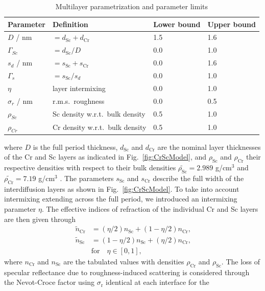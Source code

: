 \begin{table}
\centering
\caption{Multilayer parametrization and parameter limits}
\label{tbl:parametrization}
\begin{tabular}{@{}llll@{}}
\toprule
Parameter & Definition & Lower bound & Upper bound\\ \midrule
$D$ / nm & $= d_\text{Sc} + d_\text{Cr}$ & 1.5&1.6 \\ 
$\Gamma_{Sc}$ & $= d_\text{Sc} / D$&0.0 &1.0 \\ 
$s_d$ / nm&$=s_\text{Sc} + s_\text{Cr}$&0.0 & 1.6\\ 
$\Gamma_s$ &$= s_\text{Sc} / s_d$& 0.0& 1.0\\ 
$\eta$ &layer intermixing& 0.0& 1.0\\ 
$\sigma_r$ / nm & r.m.s.~roughness& 0.0& 0.5\\ 
$\rho_{Sc}$ &Sc density w.r.t.~bulk density & 0.5& 1.0\\ 
$\rho_{Cr}$ &Cr density w.r.t.~bulk density& 0.5& 1.0\\ 
 \bottomrule
\end{tabular}
\end{table}
where $D$ is the full period thickness, $d_\text{Sc}$ and $d_\text{Cr}$ are the 
nominal layer thicknesses of the Cr and Sc layers as indicated in 
Fig.~\ref{fig:CrScModel}, and $\rho_\text{Sc}$ and $\rho_\text{Cr}$ their 
respective densities with respect to their bulk densities 
$\tilde{\rho_\text{Sc}} = 2.989$ g/cm$^3$ and $\tilde{\rho_\text{Cr}} = 7.19$ 
g/cm$^3$ \cite{henke_x-ray_1993}. The parameters $s_\text{Sc}$ and $s_\text{Cr}$ describe 
the full width of the interdiffusion layers as shown in 
Fig.~\ref{fig:CrScModel}. To take into account intermixing extending across the 
full period, we introduced an intermixing parameter $\eta$. The effective 
indices of refraction of the individual Cr and Sc layers are then given through
\begin{align}
\tilde{n}_\text{Cr} &=(\eta/2) n_\text{Sc} + (1-\eta/2) n_\text{Cr} \text{,} 
\nonumber\\
\tilde{n}_\text{Sc} &=(1-\eta/2) n_\text{Sc} + (\eta/2) n_\text{Cr} \text{,} 
\label{eqn:effective_n} \\
&\text{for} \quad \eta \in [0,1] \text{,}\nonumber
\end{align}
where $n_\text{Cr}$ and $n_\text{Sc}$ are the tabulated values \cite{henke_x-ray_1993} 
with densities $\rho_\text{Cr}$ and $\rho_\text{Sc}$. The loss of specular 
reflectance due to roughness-induced scattering is considered through the 
Nevot-Croce factor using $\sigma_\text{r}$ identical at each interface for the 
